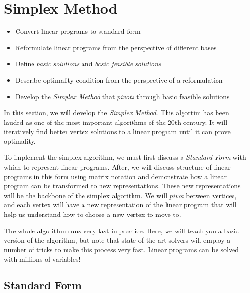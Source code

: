 \chapter{Simplex Method}
\begin{outcome}
\begin{itemize}
\item Convert linear programs to standard form
\item Reformulate linear programs from the perspective of different bases
\item Define \emph{basic solutions} and \emph{basic feasible solutions}
\item Describe optimality condition from the perspective of a reformulation
\item Develop the \emph{Simplex Method} that \emph{pivots} through basic feasible solutions
\end{itemize}
\end{outcome}
In this section, we will develop the \emph{Simplex Method}.  This algortim has been lauded as one of the most important algorithms of the 20th century.  It will iteratively find better vertex solutions to a linear program until it can prove optimality.

To implement the simplex algorithm, we must first discuss a \emph{Standard Form} with which to represent linear programs.   After, we will discuss structure of linear programs in this form using matrix notation and demonstrate how a linear program can be transformed to new representations.  These new representations will be the backbone of the simplex algorithm.  We will \emph{pivot} between vertices, and each vertex will have a new representation of the linear program that will help us understand how to choose a new vertex to move to.

The whole algorithm runs very fast in practice.  Here, we will teach you a basic version of the algorithm, but note that state-of-the art solvers will employ a number of tricks to make this process very fast.  Linear programs can be solved with millions of variables!


\section{Standard Form}






